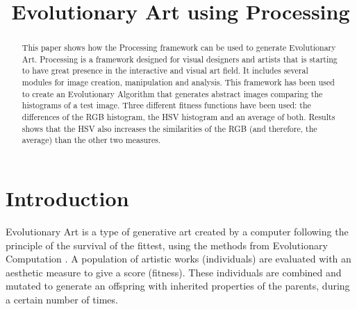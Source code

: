 \documentclass[conference]{IEEEtran}
\begin{document}
\title{Evolutionary Art using Processing}
\author{
\and
{}
\and
{}
\and
{}
\and
{}
}

\maketitle

\begin{abstract}
This paper shows how the Processing framework can be used to generate Evolutionary Art. Processing is a framework designed for visual designers and artists that is starting to have great presence in the interactive and visual art field. It includes several modules for image creation, manipulation and analysis. This framework has been used to create an Evolutionary Algorithm that generates abstract images comparing the histograms of a test image. Three different fitness functions have been used: the differences of the RGB histogram, the HSV histogram and an average of both. Results shows that the HSV also increases the similarities of the RGB (and therefore, the average) than the other two measures.
\end{abstract}

\section{Introduction}\label{intro}
Evolutionary Art \cite{EART} is a type of generative art created by a computer following the principle of the survival of the fittest, using the methods from Evolutionary Computation \cite{INTROEIBEN}. A population of artistic works (individuals) are evaluated with an aesthetic measure to give a score (fitness). These individuals are combined and mutated to generate an offspring with inherited properties of the parents, during a certain number of times.
\end{document}
